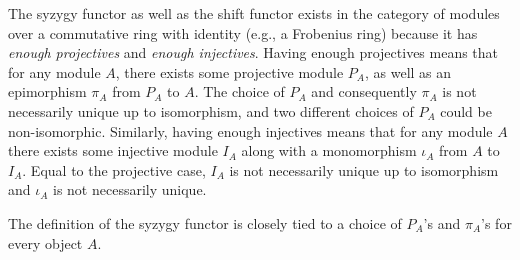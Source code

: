 The syzygy functor as well as the shift functor exists in the category of modules over a commutative ring with identity (e.g., a Frobenius ring) because it has \emph{enough projectives} and \emph{enough injectives}. Having enough projectives means that for any module \( A \), there exists some projective module \( P_A \), as well as an epimorphism \( \pi_A \) from \( P_A \) to \( A \). The choice of \( P_A \) and consequently \( \pi_A \) is not necessarily unique up to isomorphism, and two different choices of \( P_A \) could be non-isomorphic. Similarly, having enough injectives means that for any module \( A \) there exists some injective module \( I_A \) along with a monomorphism \( \iota_A \) from \( A \) to \( I_A \). Equal to the projective case, \( I_A \) is not necessarily unique up to isomorphism and \( \iota_A \) is not necessarily unique.

The definition of the syzygy functor is closely tied to a choice of \( P_A \)'s and \( \pi_A \)'s for every object \( A \).

